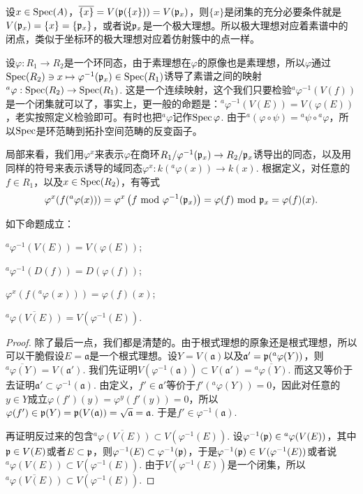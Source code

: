 设$x\in \operatorname{Spec}(A)$，$\overline{\{x\}}=V(\mathfrak{p}(\{x\}))=V(\mathfrak{p}_x)$，则$\{x\}$是闭集的充分必要条件就是$V(\mathfrak{p}_x)=\{x\}=\{\mathfrak{p}_x\}$，或者说$\mathfrak{p}_x$是一个极大理想。所以极大理想对应着素谱中的闭点，类似于坐标环的极大理想对应着仿射簇中的点一样。

\begin{para}[素谱之间的映射]
设$\varphi:R_1\to R_2$是一个环同态，由于素理想在$\varphi$的原像也是素理想，所以$\varphi$通过$\operatorname{Spec}(R_2)\ni x\mapsto \varphi^{-1}(\mathfrak{p}_x)\in \operatorname{Spec}(R_1)$诱导了素谱之间的映射$^a\varphi:\operatorname{Spec}(R_2)\to \operatorname{Spec}(R_1)$. 这是一个连续映射，这个我们只要检验$^a\varphi^{-1}(V(f))$是一个闭集就可以了，事实上，更一般的命题是：$^a\varphi^{-1}(V(E))=V(\varphi(E))$，老实按照定义检验即可。有时也把$^a\varphi$记作$\operatorname{Spec} \varphi$. 由于$^a(\varphi\circ \psi)={^a\psi}\circ{^a\varphi}$，所以$\operatorname{Spec}$是环范畴到拓扑空间范畴的反变函子。

局部来看，我们用$\varphi^x$来表示$\varphi$在商环$R_1/\varphi^{-1}(\mathfrak{p}_x)\to R_2/\mathfrak{p}_x$诱导出的同态，以及用同样的符号来表示诱导的域同态$\varphi^x:k({^a}\varphi(x))\to k(x)$. 根据定义，对任意的$f\in R_1$，以及$x\in \operatorname{Spec}(R_2)$，有等式
\[
	\varphi^x(f({^a}\varphi(x)))=\varphi^x\left(f \text{ mod } \varphi^{-1}(\mathfrak{p}_x)\right)=\varphi(f)\text{ mod } \mathfrak{p}_x=\varphi(f)(x).
\]
\end{para}

\begin{pro}\label{pro:3.8}
如下命题成立：
\begin{compactenum}[~~~1.]
\item $^a\varphi^{-1}(V(E))=V(\varphi(E))$;
\item $^a\varphi^{-1}(D(f))=D(\varphi(f))$;
\item $\varphi^x(f({^a}\varphi(x)))=\varphi(f)(x)$;
\item $\overline{{^a}\varphi(V(E))}=V(\varphi^{-1}(E))$.
\end{compactenum}
\end{pro}

\begin{proof}
除了最后一点，我们都是清楚的。由于根式理想的原象还是根式理想，所以可以干脆假设$E=\mathfrak{a}$是一个根式理想。设$Y=V(\mathfrak{a})$以及$\mathfrak{a}'=\mathfrak{p}({^a}\varphi(Y))$，则$\overline{{^a}\varphi(Y)}=V(\mathfrak{a}')$. 我们先证明$V(\varphi^{-1}(\mathfrak{a}))\subset V(\mathfrak{a}')=\overline{{^a}\varphi(Y)}$. 而这又等价于去证明$\mathfrak{a}'\subset \varphi^{-1}(\mathfrak{a})$. 由定义，$f'\in \mathfrak{a}'$等价于$f'({^a\varphi}(Y))=0$，因此对任意的$y\in Y$成立$\varphi(f')(y)=\varphi^y(f'(y))=0$，所以$\varphi(f')\in \mathfrak{p}(Y)=\mathfrak{p}(V(\mathfrak{a}))=\sqrt{\mathfrak{a}}=\mathfrak{a}$. 于是$f'\in \varphi^{-1}(\mathfrak{a})$.

再证明反过来的包含$\overline{{^a}\varphi(V(E))}\subset V(\varphi^{-1}(E))$. 设$\varphi^{-1}(\mathfrak{p})\in {^a}\varphi(V(E))$，其中$\mathfrak{p}\in V(E)$或者$E\subset \mathfrak{p}$，则$\varphi^{-1}(E)\subset \varphi^{-1}(\mathfrak{p})$，于是$\varphi^{-1}(\mathfrak{p})\in V(\varphi^{-1}(E))$或者说${^a}\varphi(V(E))\subset V(\varphi^{-1}(E))$. 由于$V(\varphi^{-1}(E))$是一个闭集，所以$\overline{{^a}\varphi(V(E))}\subset V(\varphi^{-1}(E))$.
\end{proof}

